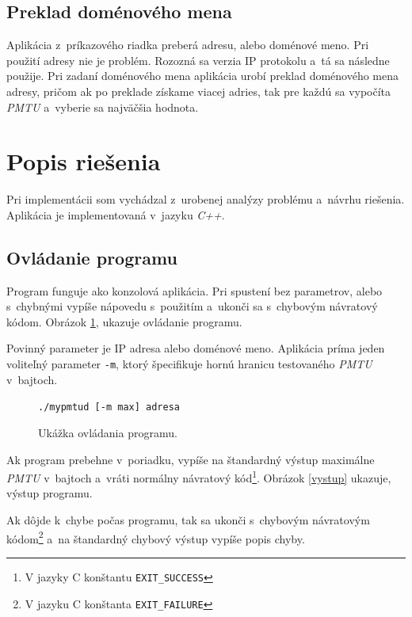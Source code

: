 \documentclass[12pt,a4paper,titlepage]{article}
\begin{document}
    \subsection{Preklad doménového mena}
        Aplikácia z~príkazového riadka preberá adresu, alebo doménové meno. Pri použití 
        adresy nie je problém. Rozozná sa verzia IP protokolu a~tá sa následne použije. 
        Pri zadaní doménového mena aplikácia urobí preklad doménového mena adresy, pričom
        ak po preklade získame viacej adries, tak pre každú sa vypočíta \emph{PMTU}
a~vyberie sa najväčšia hodnota.

    \section{Popis riešenia} \label{riesenie}
        Pri implementácii som vychádzal z~urobenej analýzy problému a~návrhu riešenia. 
        Aplikácia je implementovaná v~jazyku \emph{C++}.

    \subsection{Ovládanie programu}
        Program funguje ako konzolová aplikácia. Pri spustení bez parametrov,
        alebo s~chybnými vypíše nápovedu s~použitím a~ukonči sa s~chybovým návratový kódom.
        Obrázok \ref{ovladanie}, ukazuje ovládanie programu.

        Povinný parameter je IP adresa alebo doménové meno.
        Aplikácia príma jeden voliteľný parameter \texttt{-m}, ktorý špecifikuje hornú 
        hranicu testovaného \emph{PMTU} v~bajtoch.

        \begin{figure}[h!]
            \begin{center}
                \texttt{./mypmtud [-m max] adresa}
                \caption{Ukážka ovládania programu.}
                \label{ovladanie}
            \end{center}
        \end{figure}

        Ak program prebehne v~poriadku, vypíše na štandardný výstup maximálne 
        \emph{PMTU} v~bajtoch a~vráti normálny návratový 
        kód\footnote{V jazyky C konštantu \texttt{EXIT\_SUCCESS}}.
        Obrázok \ref{vystup} ukazuje, výstup programu.

        Ak dôjde k~chybe počas programu, tak sa ukonči s~chybovým návratovým 
        kódom\footnote{V jazyku C konštanta \texttt{EXIT\_FAILURE}} a~na
        štandardný chybový výstup vypíše popis chyby.
\end{document}

